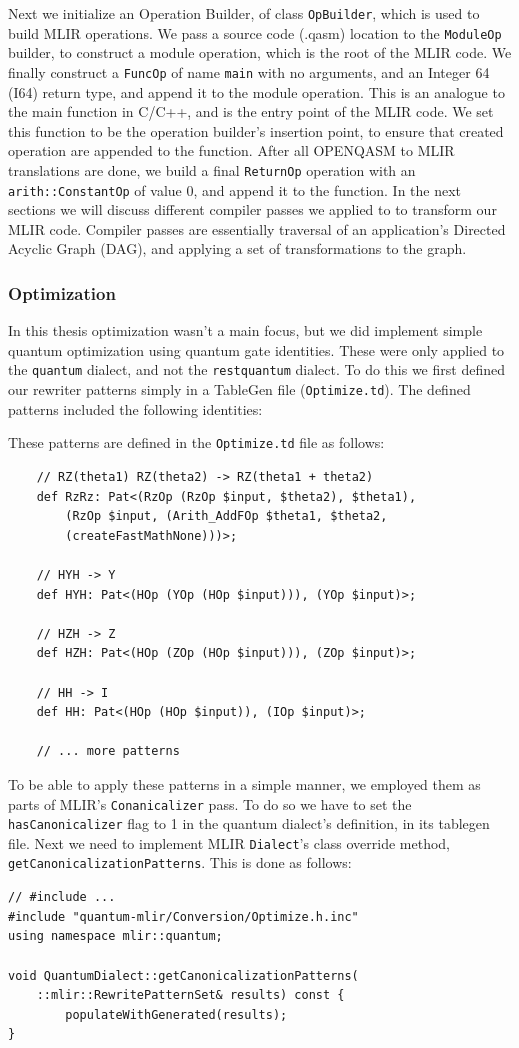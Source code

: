 Next we initialize an Operation Builder, of class \texttt{OpBuilder}, which is
used to build MLIR operations. We pass a source code (.qasm) location to the
\texttt{ModuleOp} builder, to construct a module operation, which is the root of
the MLIR code. We finally construct a \texttt{FuncOp} of name \texttt{main} with
no arguments, and an Integer 64 (I64) return type, and append it to the module
operation. This is an analogue to the main function in C/C++, and is the entry
point of the MLIR code. We set this function to be the operation builder's
insertion point, to ensure that created operation are appended to the function.
After all OPENQASM to MLIR translations are done, we build a final
\texttt{ReturnOp} operation with an \texttt{arith::ConstantOp} of value 0, and
append it to the function. In the next sections we will discuss different
compiler passes we applied to to transform our MLIR code. Compiler passes are
essentially traversal of an application's Directed Acyclic Graph (DAG), and
applying a set of transformations to the graph.

\subsubsection{Optimization}
In this thesis optimization wasn't a main focus, but we did implement simple
quantum optimization using quantum gate identities. These were only applied to
the \texttt{quantum} dialect, and not the \texttt{restquantum} dialect. To do
this we first defined our rewriter patterns simply in a TableGen file
(\texttt{Optimize.td}). The defined patterns included the following identities:

These patterns are defined in the \texttt{Optimize.td} file as follows:
\begin{verbatim}
    // RZ(theta1) RZ(theta2) -> RZ(theta1 + theta2) 
    def RzRz: Pat<(RzOp (RzOp $input, $theta2), $theta1), 
        (RzOp $input, (Arith_AddFOp $theta1, $theta2,
        (createFastMathNone)))>;

    // HYH -> Y 
    def HYH: Pat<(HOp (YOp (HOp $input))), (YOp $input)>;

    // HZH -> Z 
    def HZH: Pat<(HOp (ZOp (HOp $input))), (ZOp $input)>;

    // HH -> I 
    def HH: Pat<(HOp (HOp $input)), (IOp $input)>;

    // ... more patterns
\end{verbatim}
To be able to apply these patterns in a simple manner, we employed them as parts
of MLIR's \texttt{Conanicalizer} pass. To do so we have to set the
\texttt{hasCanonicalizer} flag to 1 in the quantum dialect's definition, in its
tablegen file. Next we need to implement MLIR \texttt{Dialect}'s class override
method, \texttt{getCanonicalizationPatterns}. This is done as follows:
\begin{verbatim}
// #include ... 
#include "quantum-mlir/Conversion/Optimize.h.inc" 
using namespace mlir::quantum;

void QuantumDialect::getCanonicalizationPatterns(
    ::mlir::RewritePatternSet& results) const { 
        populateWithGenerated(results); 
}
\end{verbatim}

